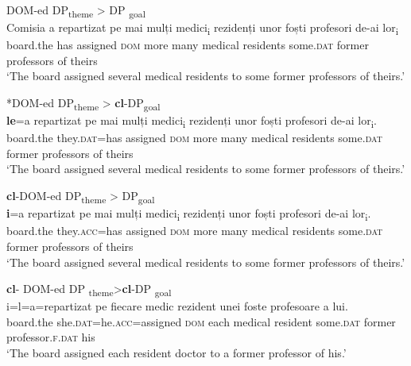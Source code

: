 \documentclass[output=paper,colorlinks,citecolor=brown,nonflat]{./langscibook}
\begin{document}
\ea%
    \label{ex:cornilescu:3}
    DOM-ed DP\textsubscript{theme} > DP \textsubscript{goal}\\
    \gll Comisia {a} {repartizat} {pe} {mai} {mulți} {medici\textsubscript{i}} {rezidenți} {unor} {foști} {profesori} {de-ai} {lor\textsubscript{i}}\\
        board.the has assigned \textsc{dom} more many medical residents some.\textsc{dat} former professors of theirs\\
    \glt ‘The board assigned several medical residents to some former professors of theirs.’
    \z



\ea%
    \label{ex:cornilescu:4}
    *DOM-ed DP\textsubscript{theme} > \textbf{cl}-DP\textsubscript{goal}\\
     \textbf{{le}}{=a} {repartizat} {pe} {mai} {mulți} {medici\textsubscript{i}} {rezidenți} {unor} {foști} {profesori} {de-ai} {lor\textsubscript{i}}.\\
        board.the  they.\textsc{dat}=has assigned  \textsc{dom} more many medical residents some.\textsc{dat} former professors of theirs\\
    \glt ‘The board assigned several medical residents to some former professors of theirs.’
    \z

          

\ea%
    \label{ex:cornilescu:5}
    \textbf{cl}-DOM-ed DP\textsubscript{theme} > DP\textsubscript{goal}\\
     \textbf{{i}}{=a} {repartizat} {pe} {mai} mulți {medici\textsubscript{i}} {rezidenți} {unor} {foști} {profesori} {de-ai} {lor\textsubscript{i}}.\\
		board.the they.\textsc{acc=}has assigned \textsc{dom} more many medical residents some.\textsc{dat} former professors of theirs\\        
    \glt ‘The board assigned several medical residents to some former professors of theirs.’
    \z




\ea%
    \label{ex:cornilescu:6}
    \textbf{cl}- DOM-ed DP \textsubscript{theme}>\textbf{cl}{}-DP \textsubscript{goal} \\
     {i=l=a=repartizat} {pe} {fiecare} {medic} {rezident} {unei} {foste} {profesoare} {a} {lui}.\\
       board.the she.\textsc{dat}=he.\textsc{acc}=assigned \textsc{dom} each medical resident some.\textsc{dat} former professor.\textsc{f}.\textsc{dat}  his\\
    \glt ‘The board assigned each resident doctor to a former professor of his.’
    \z
\end{document}
